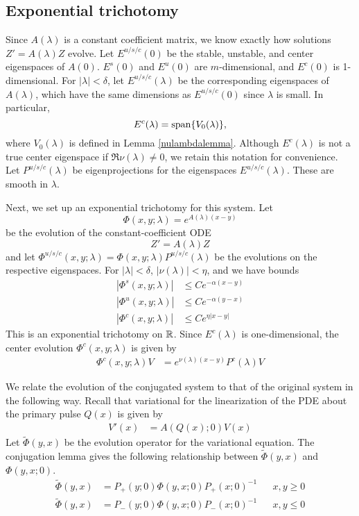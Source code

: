 \documentclass[thesis.tex]{subfiles}
\begin{document}
\subsection{Exponential trichotomy}

Since $A(\lambda)$ is a constant coefficient matrix, we know exactly how solutions $Z' = A(\lambda)Z$ evolve. Let $E^{u/s/c}(0)$ be the stable, unstable, and center eigenspaces of $A(0)$. $E^s(0)$ and $E^u(0)$ are $m$-dimensional, and $E^c(0)$ is 1-dimensional. For $|\lambda| < \delta$, let $E^{u/s/c}(\lambda)$ be the corresponding eigenspaces of $A(\lambda)$, which have the same dimensions as $E^{u/s/c}(0)$ since $\lambda$ is small. In particular, 
\[
E^c(\lambda) = \operatorname{span}\{ V_0(\lambda) \},
\]
where $V_0(\lambda)$ is defined in Lemma \ref{nulambdalemma}. Although $E^c(\lambda)$ is not a true center eigenspace if $\Re \nu(\lambda) \neq 0$, we retain this notation for convenience. Let $P^{u/s/c}(\lambda)$ be eigenprojections for the eigenspaces $E^{u/s/c}(\lambda)$. These are smooth in $\lambda$. 

Next, we set up an exponential trichotomy for this system. Let
\begin{equation}
\Phi(x, y; \lambda) = e^{A(\lambda)(x-y)}
\end{equation}
be the evolution of the constant-coefficient ODE
\[
Z' = A(\lambda) Z
\]
and let $\Phi^{u/s/c}(x, y; \lambda) = \Phi(x, y; \lambda)P^{u/s/c}(\lambda)$ be the evolutions on the respective eigenspaces. For $|\lambda| < \delta$, $|\nu(\lambda)| < \eta$, and we have bounds
\begin{equation}\label{Zevolbounds}
\begin{aligned}
|\Phi^s(x, y; \lambda)| &\leq C e^{-\alpha(x - y)} \\
|\Phi^u(x, y; \lambda)| &\leq C e^{-\alpha(y - x)} \\
|\Phi^c(x, y; \lambda)| &\leq C e^{\eta|x - y|} 
\end{aligned}
\end{equation}
This is an exponential trichotomy on $\mathbb{R}$. Since $E^c(\lambda)$ is one-dimensional, the center evolution $\Phi^c(x, y; \lambda)$ is given by
\begin{align}\label{centerevol}
\Phi^c(x, y; \lambda) V &= e^{\nu(\lambda)(x - y)} P^c(\lambda)V
\end{align}

We relate the evolution of the conjugated system to that of the original system in the following way. Recall that variational for the linearization of the PDE about the primary pulse $Q(x)$ is given by 
\begin{align}\label{vareqstab}
V'(x) &= A(Q(x); 0) V(x)
\end{align}
Let $\tilde{\Phi}(y, x)$ be the evolution operator for the variational equation. The conjugation lemma gives the following relationship between $\tilde{\Phi}(y, x)$ and $\Phi(y, x; 0)$.
\begin{align*}
\tilde{\Phi}(y, x) &= P_+(y; 0) \Phi(y, x; 0) P_+(x; 0)^{-1} && x, y \geq 0 \\
\tilde{\Phi}(y, x) &= P_-(y; 0) \Phi(y, x; 0) P_-(x; 0)^{-1} && x, y \leq 0
\end{align*}
\end{document}
